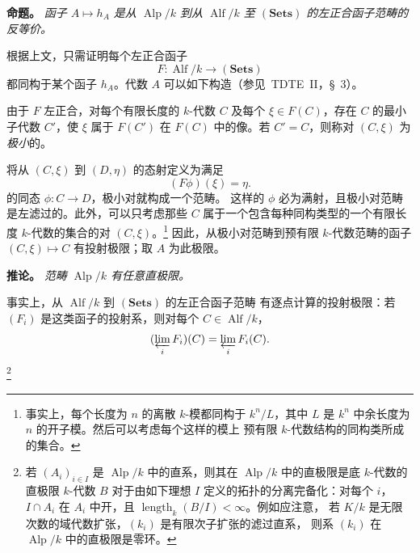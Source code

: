 \medskip
\noindent\textbf{命题。}
\label{sga3:VIIB:0.4.2-proposition}
\textit{函子 \(A\mapsto h_A\) 是从 \(\operatorname{Alp}/k\) 到从
\(\operatorname{Alf}/k\) 至 \((\mathbf{Sets})\) 的左正合函子范畴的反等价。}

根据上文，只需证明每个左正合函子
\[
  F:\operatorname{Alf}/k\longrightarrow(\mathbf{Sets})
\]
都同构于某个函子 \(h_A\)。代数 \(A\) 可以如下构造（参见\ TDTE~II，\S~3）。

由于 \(F\) 左正合，对每个有限长度的 \(k\)-代数 \(C\) 及每个
\(\xi\in F(C)\)，存在 \(C\) 的最小子代数 \(C'\)，使 \(\xi\) 属于
\(F(C')\) 在 \(F(C)\) 中的像。若 \(C'=C\)，则称对 \((C,\xi)\) 为\emph{极小}的。

将从 \((C,\xi)\) 到 \((D,\eta)\) 的态射定义为满足
\[
  (F\phi)(\xi)=\eta.
\]
的同态 \(\phi:C\to D\)，极小对就构成一个范畴。
这样的 \(\phi\) 必为满射，且极小对范畴是左滤过的。此外，可以只考虑那些 \(C\)
属于一个包含每种同构类型的一个有限长度 \(k\)-代数的集合的对 \((C,\xi)\)。\footnote{
事实上，每个长度为 \(n\) 的离散 \(k\)-模都同构于 \(k^n/L\)，其中
\(L\) 是 \(k^n\) 中余长度为 \(n\) 的开子模。然后可以考虑每个这样的模上
预有限 \(k\)-代数结构的同构类所成的集合。}
因此，从极小对范畴到预有限 \(k\)-代数范畴的函子 \((C,\xi)\mapsto C\)
有投射极限；取 \(A\) 为此极限。

\medskip
\noindent\textbf{推论。}
\label{sga3:VIIB:0.4.2-corollary}
\textit{范畴 \(\operatorname{Alp}/k\) 有任意直极限。}

事实上，从 \(\operatorname{Alf}/k\) 到 \((\mathbf{Sets})\) 的左正合函子范畴
有逐点计算的投射极限：若 \((F_i)\) 是这类函子的投射系，则对每个
\(C\in\operatorname{Alf}/k\)，
\[
  (\varprojlim_iF_i)(C)=\varprojlim_iF_i(C).
\]
\footnote{若 \((A_i)_{i\in I}\) 是 \(\operatorname{Alp}/k\) 中的直系，则其在
\(\operatorname{Alp}/k\) 中的直极限是底 \(k\)-代数的直极限 \(k\)-代数 \(B\)
对于由如下理想 \(I\) 定义的拓扑的分离完备化：对每个 \(i\)，\(I\cap A_i\)
在 \(A_i\) 中开，且 \(\operatorname{length}_k(B/I)<\infty\)。例如应注意，
若 \(K/k\) 是无限次数的域代数扩张，\((k_i)\) 是有限次子扩张的滤过直系，
则系 \((k_i)\) 在 \(\operatorname{Alp}/k\) 中的直极限是零环。}

